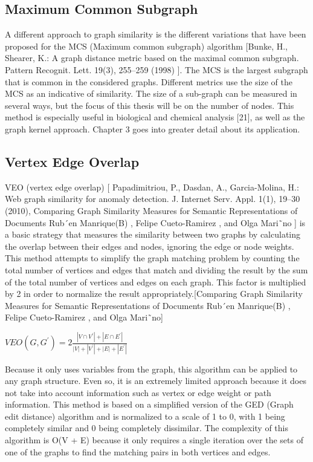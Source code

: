 \subsection{Maximum Common Subgraph}
A different approach to graph similarity is the different variations that have been proposed for the MCS (Maximum common subgraph) algorithm [Bunke, H., Shearer, K.: A graph distance metric based on the maximal common subgraph. Pattern Recognit. Lett. 19(3), 255–259 (1998) ]. The MCS is the largest subgraph that is common in the considered graphs. Different metrics use the size of the MCS as an indicative of similarity. The size of a sub-graph can be measured in several ways, but the focus of this thesis will be on the number of nodes. This method is especially useful in biological and chemical analysis [21], as well as the graph kernel approach. Chapter 3 goes into greater detail about its application.

\subsection{Vertex Edge Overlap}
VEO (vertex edge overlap) [ Papadimitriou, P., Dasdan, A., Garcia-Molina, H.: Web graph similarity for anomaly detection. J. Internet Serv. Appl. 1(1), 19–30 (2010), Comparing Graph Similarity Measures for Semantic Representations of Documents Rub´en Manrique(B) , Felipe Cueto-Ramirez , and Olga Mari˜no ] is a basic strategy that measures the similarity between two graphs by calculating the overlap between their edges and nodes, ignoring the edge or node weights.  This method  attempts to simplify the graph matching problem by counting the total number of vertices and edges that match and dividing the result by the sum of the total number of vertices and edges on each graph. This factor is multiplied by 2 in order to normalize the result appropriately.[Comparing Graph Similarity Measures for Semantic Representations of Documents Rub´en Manrique(B) , Felipe Cueto-Ramirez , and Olga Mari˜no]

$V E O\left(G, G^{\prime}\right)=2 \frac{\left|V \cap V^{\prime}\right|+\left|E \cap E^{\prime}\right|}{|V|+\left|V^{\prime}\right|+|E|+\left|E^{\prime}\right|}$

Because it only uses variables from the graph, this algorithm can be applied to any graph structure. Even so, it is an extremely limited approach because it does not take into account information such as vertex or edge weight or path information. This method is based on a simplified version of the GED (Graph edit distance) algorithm and is normalized to a scale of 1 to 0, with 1 being completely similar and 0 being completely dissimilar. The complexity of this algorithm is O(V + E) because it only requires a single iteration over the sets of one of the graphs to find the matching pairs in both vertices and edges.


